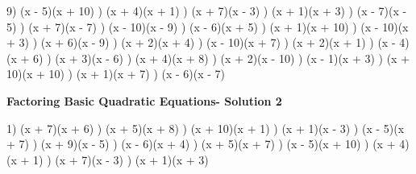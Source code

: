 \documentclass{article}%
\begin{document}
9) (x - 5)(x + 10)%
) (x + 4)(x + 1)%
) (x + 7)(x - 3)%
) (x + 1)(x + 3)%
) (x - 7)(x - 5)%
) (x + 7)(x - 7)%
) (x - 10)(x - 9)%
) (x - 6)(x + 5)%
) (x + 1)(x + 10)%
) (x - 10)(x + 3)%
) (x + 6)(x - 9)%
) (x + 2)(x + 4)%
) (x - 10)(x + 7)%
) (x + 2)(x + 1)%
) (x - 4)(x + 6)%
) (x + 3)(x - 6)%
) (x + 4)(x + 8)%
) (x + 2)(x - 10)%
) (x - 1)(x + 3)%
) (x + 10)(x + 10)%
) (x + 1)(x + 7)%
) (x - 6)(x - 7)%
\newline%
\newpage%
\large%
\begin{center}%
\textbf{Factoring Basic Quadratic Equations- Solution 2}%
\newline%
\end{center} \normalsize%
1) (x + 7)(x + 6)%
) (x + 5)(x + 8)%
) (x + 10)(x + 1)%
) (x + 1)(x - 3)%
) (x - 5)(x + 7)%
) (x + 9)(x - 5)%
) (x - 6)(x + 4)%
) (x + 5)(x + 7)%
) (x - 5)(x + 10)%
) (x + 4)(x + 1)%
) (x + 7)(x - 3)%
) (x + 1)(x + 3)%
\newline%
\end{document}
